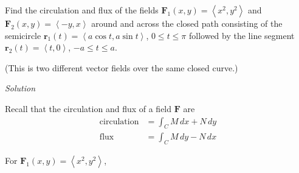 \documentclass{article}
\newcommand{\lra}[1]{\left\langle #1 \right\rangle}
\renewcommand{\r}[0]{\mathbf{r}}
\newcommand{\F}[0]{\mathbf{F}}
\newcommand{\Solution}{\textit{Solution}}
\begin{document}
Find the circulation and flux of the fields $\F_1(x,y)=\lra{x^2,y^2}$ and $\F_2(x,y)=\lra{-y,x}$
around and across the closed path consisting of the semicircle $\r_1(t)=\lra{a\cos t, a\sin t}$, $0\leq t \leq \pi$ followed by the line segment $\r_2 (t)=\lra{t,0}$, $-a\leq t \leq a$.

(This is two different vector fields over the same closed curve.)

\Solution

Recall that the circulation and flux of a field $\F$ are
\begin{align*}
    \text{circulation}&=\int_C M\,dx + N\,dy\\
    \text{flux}&=\int_C M\,dy - N\,dx
\end{align*}
{}

For $\F_1(x,y)=\lra{x^2,y^2}$,
\end{document}

